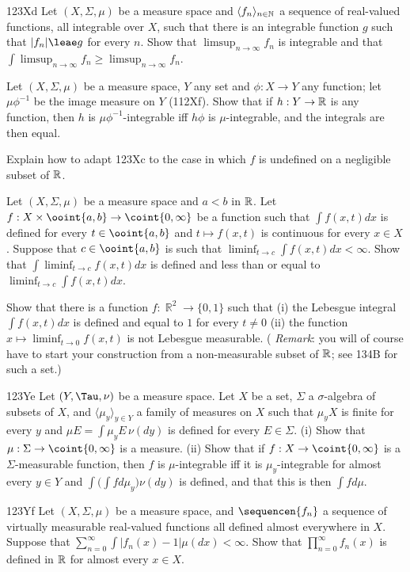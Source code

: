 {\spheader 123Xd Let $(X,\Sigma,\mu)$ be a measure space
and $\langle f_n\rangle_{n\in\Bbb N}$ a sequence of
real-valued functions, all integrable over $X$, such that
there is an
integrable function $g$ such that $|f_n|\leae g$ for every $n$.
Show that $\limsup_{n\to\infty}f_n$ is integrable and that
$\int\limsup_{n\to\infty}f_n\ge\limsup_{n\to\infty}f_n$.

Let $(X,\Sigma,\mu)$ be a measure
space, $Y$ any set and
$\phi:X\to Y$ any function;  let $\mu\phi^{-1}$ be the image measure on
$Y$ (112Xf).   Show that if $h:Y\to\Bbb R$ is any function, then $h$
is $\mu\phi^{-1}$-integrable iff $h\phi$ is $\mu$-integrable, and the
integrals are then equal.

 Explain how to adapt 123Xc to the case in which
$f$ is undefined on a negligible subset of $\Bbb R$.

 Let $(X,\Sigma,\mu)$ be a measure space and
$a<b$
in $\Bbb R$.   Let $f:X\times\ooint{a,b}\to\coint{0,\infty}$ be a
function
such that $\int f(x,t)dx$ is defined for every $t\in\ooint{a,b}$ and
$t\mapsto f(x,t)$ is continuous for every $x\in X$.   Suppose that
$c\in\ooint{a,b}$ is such that $\liminf_{t\to c}\int f(x,t)dx<\infty$.
Show that $\int\liminf_{t\to c}f(x,t)dx$ is defined and less than or
equal to $\liminf_{t\to c}\int f(x,t)dx$.

 Show that there is a function
$f:\BbbR^2\to\{0,1\}$ such that (i) the Lebesgue integral
$\int f(x,t)dx$ is defined and equal to $1$ for every $t\ne 0$ (ii) the
function $x\mapsto\liminf_{t\to 0}f(x,t)$ is not
Lebesgue measurable.   ({\it
Remark\/}:  you will of course have to start your construction from a
non-measurable subset of $\Bbb R$;  see 134B for such a set.)

\spheader 123Ye Let $(Y,\Tau,\nu)$ be a measure space.  Let $X$ be a
set, $\Sigma$ a $\sigma$-algebra of subsets of $X$, and
$\langle\mu_y\rangle_{y\in Y}$ a family of measures on $X$ such that
$\mu_yX$ is finite for every $y$ and $\mu E=\int\mu_yE\,\nu(dy)$ is
defined for every $E\in\Sigma$.   (i) Show that
$\mu:\Sigma\to\coint{0,\infty}$ is
a measure.   (ii) Show that if $f:X\to\coint{0,\infty}$ is a
$\Sigma$-measurable function, then $f$ is
$\mu$-integrable iff it is $\mu_y$-integrable for almost every $y\in Y$
and $\int\bigl(\int fd\mu_y\bigr)\nu(dy)$ is defined, and that this is
then $\int fd\mu$.

\spheader 123Yf Let $(X,\Sigma,\mu)$ be a measure space, and
$\sequencen{f_n}$ a sequence of virtually measurable real-valued
functions all defined almost everywhere in $X$.   Suppose that
$\sum_{n=0}^{\infty}\int|f_n(x)-1|\mu(dx)<\infty$.   Show that
$\prod_{n=0}^{\infty}f_n(x)$ is defined in $\Bbb R$ for almost every
$x\in X$.

}%

